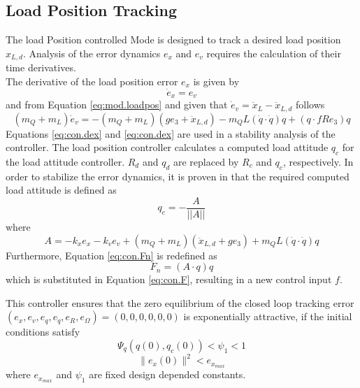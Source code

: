 \subsection{Load Position Tracking}\label{sec:con.loadpos}
The load Position controlled Mode is designed to track a desired load position $ x_{L,d} $. 
Analysis of the error dynamics $ e_x $ and $ e_v $ requires the calculation of their time derivatives.\\
The derivative of the load position error $ e_x $ is given by
\begin{equation}\label{eq:con.dex}
\dot{e}_x = e_v
\end{equation}
and from Equation \ref{eq:mod.loadpos} and given that $ \dot{e}_v=\ddot{x}_L-\ddot{x}_{L,d} $ follows
\begin{equation}\label{eq:con.dev}
(m_Q+m_L)\dot{e}_v=-(m_Q+m_L)(ge_3+\ddot{x}_{L,d})-m_QL(\dot{q}\cdot\dot{q})q+(q\cdot fRe_3)q
\end{equation}
Equations \ref{eq:con.dex} and \ref{eq:con.dex} are used in a stability analysis of the controller. 
The load position controller calculates a computed load attitude $ q_c$ for the load attitude controller. $ R_d $ and $ q_d $ are replaced by $ R_c $ and $ q_c $, respectively. 
In order to stabilize the error dynamics, it is proven in \cite{Sreenath2013c} that the required computed load attitude is defined as
\begin{equation}\label{eq:con.q}
q_c = - \frac{A}{||A||}
\end{equation}
where
\begin{equation}\label{eq:con.A}
A = -k_xe_x-k_ve_v+(m_Q+m_L)(\ddot{x}_{L,d}+ge_3)+m_QL(\dot{q}\cdot\dot{q})q
\end{equation}
Furthermore, Equation \ref{eq:con.Fn} is redefined as
\begin{equation}\label{key}
F_n=(A\cdot q)q
\end{equation}
which is substituted in Equation \ref{eq:con.F}, resulting in a new control input $ f $. 

This controller ensures that the zero equilibrium of the closed loop tracking error $ (e_x,e_v,e_q,e_{\dot{q}},e_R,e_\Omega)=(0,0,0,0,0,0) $ is exponentially attractive, if the initial conditions satisfy
\begin{equation}\label{eq:dom5}
\Psi_q(q(0),q_c(0))<\psi_1<1
\end{equation}
\begin{equation}
\parallel e_{x}(0)\parallel^2<e_{x_{max}}
\end{equation}
where $ e_{x_{max}} $ and $ \psi_1 $ are fixed design depended constants. 

